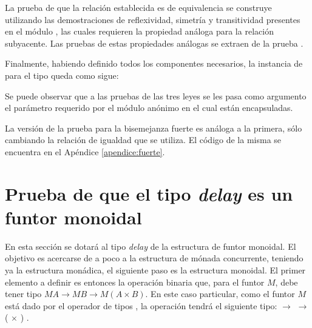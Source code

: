 \begin{AgdaAlign}

La prueba de que la relación establecida es de equivalencia se construye utilizando las demostraciones de reflexividad, simetría y transitividad presentes en el módulo , las cuales requieren la propiedad análoga para la relación subyacente. Las pruebas de estas propiedades análogas se extraen de la prueba . 


Finalmente, habiendo definido todos los componentes necesarios, la instancia de  para el tipo \AgdaDatatype{$\_\bot$} queda como sigue:

\end{AgdaAlign}

Se puede observar que a las pruebas de las tres leyes se les pasa como argumento el parámetro requerido por el módulo anónimo en el cual están encapsuladas. 

La versión de la prueba para la bisemejanza fuerte es análoga a la primera, sólo cambiando la relación de igualdad que se utiliza. El código de la misma se encuentra en el Apéndice \ref{apendice:fuerte}.


\section{Prueba de que el tipo \textit{delay} es un funtor monoidal}\label{casodelay:monoidal}

En esta sección se dotará al tipo \textit{delay} de la estructura de funtor monoidal. El objetivo es acercarse de a poco a la estructura de mónada concurrente, teniendo ya la estructura monádica, el siguiente paso es la estructura monoidal. El primer elemento a definir es entonces la operación binaria que, para el funtor $\mathit{M}$, debe tener tipo $\mathit{M} A \rightarrow \mathit{M} B \rightarrow \mathit{M} (A \times B)$.  En este caso particular, como el funtor $\mathit{M}$ está dado por el operador de tipos \AgdaDatatype{$\_\bot$}, la operación  tendrá el siguiente tipo:  \AgdaDatatype{$\bot$} $\rightarrow$  \AgdaDatatype{$\bot$} $\rightarrow$ ( $\times$ ) \AgdaDatatype{$\bot$}.


